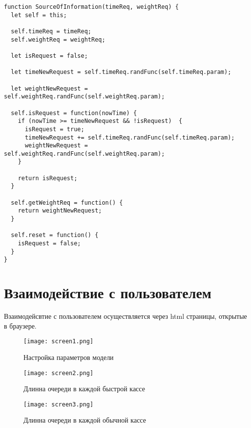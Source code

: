 \begin{lstlisting}[caption={Программная модель покупателя}]
function SourceOfInformation(timeReq, weightReq) {
  let self = this;
  
  self.timeReq = timeReq;
  self.weightReq = weightReq;

  let isRequest = false;

  let timeNewRequest = self.timeReq.randFunc(self.timeReq.param);
  
  let weightNewRequest = self.weightReq.randFunc(self.weightReq.param);

  self.isRequest = function(nowTime) {
    if (nowTime >= timeNewRequest && !isRequest)  {
      isRequest = true;
      timeNewRequest += self.timeReq.randFunc(self.timeReq.param);
      weightNewRequest = self.weightReq.randFunc(self.weightReq.param);
    }

    return isRequest;
  }

  self.getWeightReq = function() {
    return weightNewRequest;
  }

  self.reset = function() {
    isRequest = false;
  }
}
\end{lstlisting}


\section{Взаимодействие с пользователем}

Взаимодейсвтие с пользователем осуществляется через html страницы, открытые в браузере.

\begin{figure}
  \centering
  \texttt{[image: screen1.png]}
  \caption{Настройка параметров модели}
\end{figure}

\begin{figure}
  \centering
  \texttt{[image: screen2.png]}
  \caption{Длинна очереди в каждой быстрой кассе}
\end{figure}

\begin{figure}
  \centering
  \texttt{[image: screen3.png]}
  \caption{Длинна очереди в каждой обычной кассе}
\end{figure}